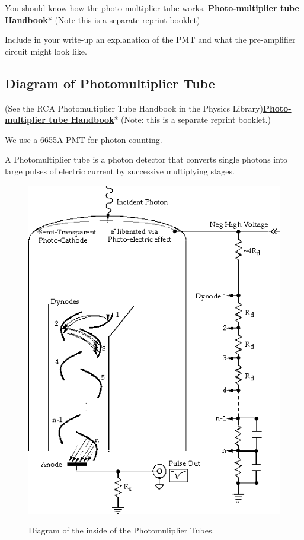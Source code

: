 \documentclass{../lab}
\begin{document}
You should know how the photo-multiplier tube works. \href{http://physics111.lib.berkeley.edu/Physics111/Equipment\_Manuals/RCA\_PMT.pdf}{\textbf{Photo-multiplier tube Handbook}}* (Note this is a separate reprint booklet)

Include in your write-up an explanation of the PMT and what the pre-amplifier circuit might look like.

\subsection{Diagram of Photomultiplier Tube}

(See the RCA Photomultiplier Tube Handbook in the Physics Library)\href{http://physics111.lib.berkeley.edu/Physics111/Equipment\_Manuals/RCA\_PMT.pdf}{\textbf{Photo-multiplier tube Handbook}}* (Note: this is a separate reprint booklet.)

We use a 6655A PMT for photon counting.

A Photomultiplier tube is a photon detector that converts single photons into large pulses of electric current by successive multiplying stages.

\begin{figure}[h]
    \centering
    \href{http://experimentationlab.berkeley.edu/sites/default/files/images/BRAimage047.gif}{\includegraphics[width=0.5\linewidth]{images/BRAimage047.png}}
    \caption{Diagram of the inside of the Photomuliplier Tubes.}
    \label{fig:BRAimage047}
\end{figure}
\end{document}
